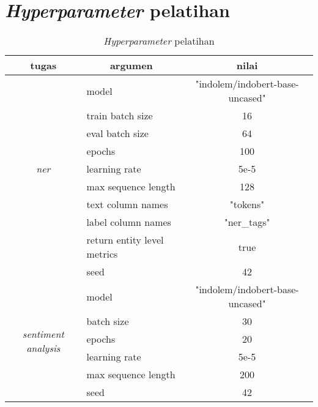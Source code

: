 \appendix

\chapter{\textit{Hyperparameter} pelatihan}

\begin{table}[h]
    \centering
    \caption{\textit{Hyperparameter} pelatihan}
    \label{appendix:hyperparameter-train}
    \begin{tabular}{|c|l|c|}
        \hline \rowcolor{black!10}
        \textbf{tugas} & \multicolumn{1}{|c|}{\textbf{argumen}} & \textbf{nilai} \\ \hline
        \multirow{9}{*}{\textit{ner}} & model & "indolem/indobert-base-uncased" \\ \cline{2-3}
                                      & train batch size & 16 \\ \cline{2-3}
                                      & eval batch size & 64 \\ \cline{2-3}
                                      & epochs & 100 \\ \cline{2-3}
                                      & learning rate & 5e-5 \\ \cline{2-3}
                                      & max sequence length & 128 \\ \cline{2-3}
                                      & text column names & "tokens" \\ \cline{2-3}
                                      & label column names & "ner\_tags" \\ \cline{2-3}
                                      & return entity level metrics & true \\ \cline{2-3}
                                      & seed & 42 \\ \hline
        \multirow{7}{*}{\textit{sentiment analysis}} & model & "indolem/indobert-base-uncased" \\ \cline{2-3}
                                                     & batch size & 30 \\ \cline{2-3}
                                                     & epochs & 20 \\ \cline{2-3}
                                                     & learning rate & 5e-5 \\ \cline{2-3}
                                                     & max sequence length & 200 \\ \cline{2-3}
                                                     & seed & 42 \\ \cline{2-3}

\end{tabular}
\end{table}
